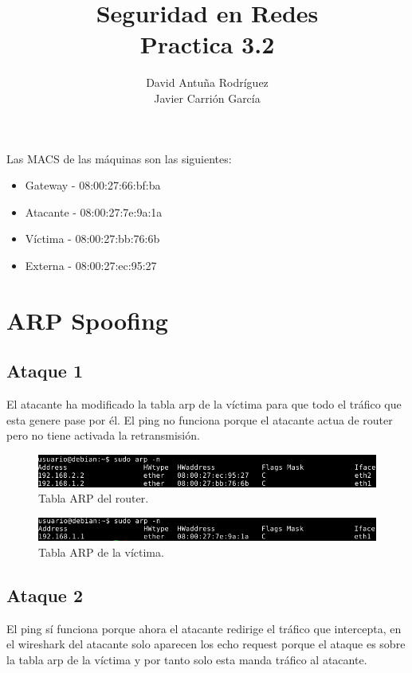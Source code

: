 \documentclass[11pt]{article}
\title{\Large Seguridad en Redes\\Practica 3.2}
\author{David Antuña Rodríguez\\Javier Carrión García}
\date{}
\begin{document}
  \raggedright

  \maketitle
  \newpage

  \par
  Las MACS de las máquinas son las siguientes:
  \begin{itemize}
    \item Gateway - 08:00:27:66:bf:ba
    \item Atacante - 08:00:27:7e:9a:1a
    \item Víctima - 08:00:27:bb:76:6b
    \item Externa - 08:00:27:ec:95:27
  \end{itemize}

  \section{ARP Spoofing}
    \subsection{Ataque 1}
      \par
      El atacante ha modificado la tabla arp de la víctima para que todo el
      tráfico que esta genere pase por él. El ping no funciona porque el atacante
      actua de router pero no tiene activada la retransmisión.

      \begin{figure}[H]
        \centering
        \includegraphics[width = \textwidth]{arptable_gw}
        \caption{Tabla ARP del router.}
      \end{figure}

      \begin{figure}[H]
        \centering
        \includegraphics[width = \textwidth]{arptable_vic}
        \caption{Tabla ARP de la víctima.}
      \end{figure}
    \subsection{Ataque 2}
      \par
      El ping sí funciona porque ahora el atacante redirige el tráfico que
      intercepta, en el wireshark del atacante solo aparecen los echo request
      porque el ataque es sobre la tabla arp de la víctima y por tanto solo esta
      manda tráfico al atacante.
\end{document}
